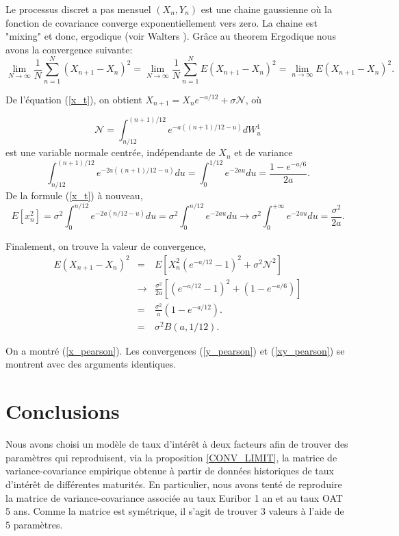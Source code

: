 \documentclass[12pt, a4paper]{book}
\begin{document}
{Le processus discret a pas mensuel $(X_n,Y_n)$ est une chaine gaussienne où la fonction de covariance converge exponentiellement vers zero. La chaine est "mixing" et donc, ergodique (voir Walters \cite{W}). Grâce au theorem Ergodique nous avons la convergence suivante:
$$\lim_{N\rightarrow \infty} \frac{1}{N}\sum_{n=1}^N (X_{n+1}-X_n)^2 = \lim_{N\rightarrow \infty} \frac{1}{N}\sum_{n=1}^N E(X_{n+1}-X_n)^2 = \lim_{n\rightarrow \infty} E(X_{n+1}-X_n)^2.$$

De l'équation (\ref{x_t}), on obtient $ X_{n+1} = X_n e^{-a/12 } +\sigma \mathcal{N}$, où  

$$ \mathcal{N} = \int_{n/12}^{(n+1)/12}e^{-a((n+1)/12 -u)}d W_u^1$$ est une variable normale centrée, indépendante de $X_n$ et  de variance 
$$ \int_{n/12}^{(n+1)/12}e^{-2a((n+1)/12 -u)}du = \int_0^{1/12} e^{-2au}du = \frac{1-e^{-a/6}}{2a}.$$
De la formule (\ref{x_t}) à nouveau,
$$E[x_n^2]=\sigma^2\int_0 ^ {n/12} e^{-2a(n/12- u)}du= \sigma^2\int_0 ^ {n/12} e^{-2au}du\rightarrow \sigma^2\int_0 ^ {+\infty} e^{-2au}du=\frac{\sigma^2}{2a}.$$
 
Finalement, on trouve la valeur de convergence,
\begin{eqnarray}
E(X_{n+1}-X_n)^2&=&E[X_n^2(e^{-a/12}-1)^2 +\sigma^2 \mathcal{N}^2]\nonumber\\
&\rightarrow & \frac{\sigma^2}{2a}[(e^{-a/12}-1)^2+(1-e^{-a/6})]\nonumber\\
&=&\frac{\sigma^2}{a}(1-e^{-a/12}).\nonumber\\
&=&\sigma ^2 B(a,1/12)\nonumber.
\end{eqnarray}

On a montré (\ref{x_pearson}). Les convergences (\ref{y_pearson}) et (\ref{xy_pearson}) se montrent avec des arguments identiques. 


\section{Conclusions}


Nous avons choisi un modèle de taux d'intérêt à deux facteurs afin de trouver des paramètres qui reproduisent, via la proposition \ref{CONV_LIMIT}, la matrice de variance-covariance empirique obtenue à partir de données historiques de taux d'intérêt de différentes maturités. En particulier, nous avons tenté de reproduire la matrice de variance-covariance associée au taux Euribor 1 an et au taux OAT 5 ans. Comme la matrice est symétrique, il s'agit de trouver 3 valeurs à l'aide de 5 paramètres.

}
\end{document}
